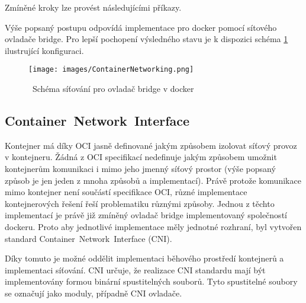 Zmíněné kroky lze provést následujícími příkazy.



Výše popsaný postupu odpovídá implementace pro docker pomocí sítového ovladače bridge. Pro lepší pochopení výsledného stavu je k dispozici schéma \ref{img:ContainerNetworking} ilustrující konfiguraci.\\

\begin{figure}[ht]
\centering
\texttt{[image: images/ContainerNetworking.png]}
\caption{~Schéma síťování pro ovladač bridge v docker\cite{velichko_2020_connecting}}\label{img:ContainerNetworking}
\end{figure}

\subsection{Container~Network~Interface}\label{cni}
Kontejner má díky OCI jasně definované jakým způsobem izolovat síťový provoz v kontejneru. Žádná z OCI specifikací nedefinuje jakým způsobem umožnit kontejnerům komunikaci i mimo jeho jmenný síťový prostor (výše popsaný způsob je jen jeden z mnoha způsobů a implementací). Právě protože komunikace mimo kontejner není součástí specifikace OCI, různé implementace kontejnerových řešení řeší problematiku různými způsoby. Jednou z těchto implementací je právě již zmíněný ovladač bridge implementovaný společností dockeru. Proto aby jednotlivé implementace měly jednotné rozhraní, byl vytvořen standard Container~Network~Interface (CNI).

Díky tomuto je možné oddělit implementaci běhového prostředí kontejnerů a implementaci síťování. CNI určuje, že realizace CNI standardu mají být implementovány formou binární spustitelných souborů. Tyto spustitelné soubory se označují jako moduly, případně CNI ovladače.


